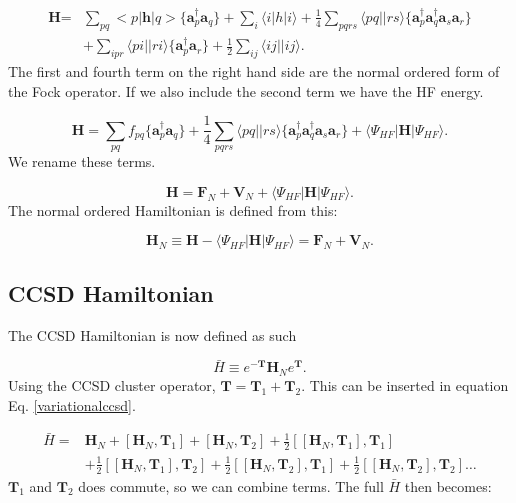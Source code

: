 \begin{align}
\textbf{H} = & \sum_{pq} <p|\textbf{h}|q> 
\{\textbf{a}^{\dag}_p \textbf{a}_q \}
+ \sum_i \langle i|h|i \rangle
 + \frac{1}{4}
\sum_{pqrs} \langle pq||rs \rangle \{\textbf{a}^{\dag}_p \textbf{a}^{\dag}_q \textbf{a}_s \textbf{a}_r\}
 \\ &
+ \sum_{ipr} \langle pi||ri \rangle \{\textbf{a}^{\dag}_p \textbf{a}_r \}
+ \frac{1}{2} \sum_{ij} \langle ij||ij \rangle . \nonumber
\end{align}
The first and fourth term on the right hand side are the normal ordered form of the Fock operator. If we also include the second term we have the HF energy.

\begin{equation}
\textbf{H} = \sum_{pq} f_{pq} 
\{\textbf{a}^{\dag}_p \textbf{a}_q \}
 + \frac{1}{4}
\sum_{pqrs} \langle pq||rs \rangle \{\textbf{a}^{\dag}_p \textbf{a}^{\dag}_q \textbf{a}_s \textbf{a}_r\}
+ \langle \Psi_{HF} | \textbf{H} |\Psi_{HF} \rangle .
\end{equation}
We rename these terms.

\begin{equation}
\textbf{H} = \textbf{F}_N + \textbf{V}_N + \langle \Psi_{HF} | \textbf{H} |\Psi_{HF} \rangle .
\end{equation}
The normal ordered Hamiltonian is defined from this:

\begin{equation}
\textbf{H}_N \equiv 
\textbf{H} - \langle \Psi_{HF} | \textbf{H} |\Psi_{HF} \rangle = 
\textbf{F}_N + \textbf{V}_N . \label{normal_order_hamiltonian}
\end{equation}

\subsection{CCSD Hamiltonian}

The CCSD Hamiltonian is now defined as such

\begin{equation}
\bar{H} \equiv e^{-\textbf{T}} \textbf{H}_N e^{\textbf{T}}  .
\end{equation}
Using the CCSD cluster operator, $\textbf{T} = \textbf{T}_1 + \textbf{T}_2$. This can be inserted in equation Eq. \eqref{variationalccsd}. 

\begin{align}
\bar{H} = & 
\textbf{H}_N 
+ \left[ \textbf{H}_N, \textbf{T}_1 \right] 
+ \left[ \textbf{H}_N, \textbf{T}_2 \right] 
+ \frac{1}{2} \left[ [\textbf{H}_N, \textbf{T}_1], \textbf{T}_1 \right]  \\ &
+ \frac{1}{2} \left[ [\textbf{H}_N, \textbf{T}_1], \textbf{T}_2  \right]
+ \frac{1}{2} \left[ [\textbf{H}_N, \textbf{T}_2], \textbf{T}_1 \right]
+ \frac{1}{2} \left[ [\textbf{H}_N, \textbf{T}_2], \textbf{T}_2 \right] \dots \nonumber
\end{align}
$\textbf{T}_1$ and $\textbf{T}_2$ does commute, so we can combine terms. The full $\bar{H}$ then becomes:

